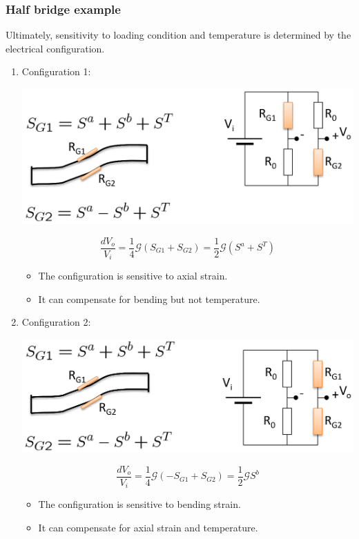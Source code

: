 \documentclass[11pt]{article}
\begin{document}
\subsubsection{Half bridge example}
\label{sec:org4537cfb}
Ultimately, sensitivity to loading condition and temperature is determined by the electrical configuration.

\begin{enumerate}
\item Configuration 1:
\begin{center}
\includegraphics[width=.9\linewidth]{./images/apparent-strain-half-bridge-configuration-1.png}
\end{center}
\[\frac{dV_o}{V_i} = \frac{1}{4} \mathcal{G} (S_{G1} + S_{G2}) = \frac{1}{2} \mathcal{G} (S^a + S^T)\]

\begin{itemize}
\item The configuration is sensitive to axial strain.
\item It can compensate for bending but not temperature.
\end{itemize}

\item Configuration 2:
\begin{center}
\includegraphics[width=.9\linewidth]{./images/apparent-strain-half-bridge-configuration-2.png}
\end{center}
\[\frac{dV_o}{V_i} = \frac{1}{4} \mathcal{G} (-S_{G1} + S_{G2}) = \frac{1}{2} \mathcal{G} S^b\]

\begin{itemize}
\item The configuration is sensitive to bending strain.
\item It can compensate for axial strain and temperature.
\end{itemize}
\end{enumerate}
\end{document}
